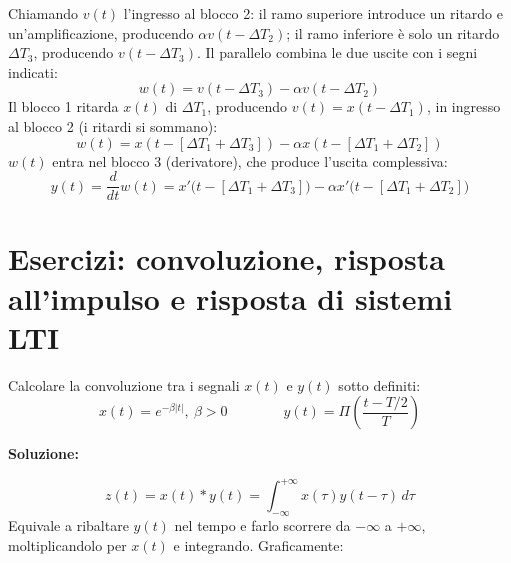 \documentclass[12pt, a4paper]{article}
\begin{document}
Chiamando $v(t)$ l'ingresso al blocco 2: il ramo superiore introduce un ritardo e un'amplificazione, producendo $\alpha v(t-\Delta T_2)$; il ramo inferiore è solo un ritardo $\Delta T_3$, producendo $v(t-\Delta T_3)$. Il parallelo combina le due uscite con i segni indicati:
$$w(t) = v(t-\Delta T_3)-\alpha v(t-\Delta T_2)$$
Il blocco 1 ritarda $x(t)$ di $\Delta T_1$, producendo $v(t)=x(t-\Delta T_1)$, in ingresso al blocco 2 (i ritardi si sommano):
$$w(t) = x(t-[\Delta T_1+\Delta T_3])-\alpha x(t-[\Delta T_1+\Delta T_2])$$
$w(t)$ entra nel blocco 3 (derivatore), che produce l'uscita complessiva:
$$y(t) = \frac{d}{dt}w(t) = x'\big(t-[\Delta T_1+\Delta T_3]\big)-\alpha x'\big(t-[\Delta T_1+\Delta T_2]\big)$$

\section{Esercizi: convoluzione, risposta all'impulso e risposta di sistemi LTI}

\begin{tcolorbox}[colback=lightergray!10, colframe=tocsec, title=\textbf{Esercizio 1}]
Calcolare la convoluzione tra i segnali $x(t)$ e $y(t)$ sotto definiti:
$$x(t) = e^{-\beta|t|},\ \beta>0 \qquad\qquad y(t) = \Pi\!\left(\frac{t-T/2}{T}\right)$$
\end{tcolorbox}

\textbf{Soluzione:}

$$z(t) = x(t)*y(t) = \int_{-\infty}^{+\infty} x(\tau)y(t-\tau)\,d\tau$$
Equivale a ribaltare $y(t)$ nel tempo e farlo scorrere da $-\infty$ a $+\infty$, moltiplicandolo per $x(t)$ e integrando. Graficamente:

\begin{center}


\end{center}
\end{document}
